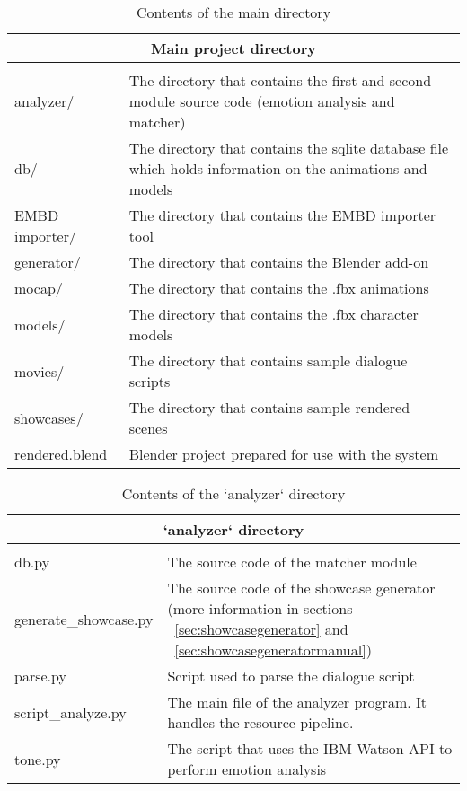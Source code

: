 \begin{table}[H]
	\centering
	\small
	
	\begin{tabular}{ |p{8.5em}|p{30.1em}| }
		\hline
		\multicolumn{2}{|c|}{\textbf{Main project directory}} \\
		\hline
		\thead{Item} & \thead{Description} \\
		\hline
		analyzer/ & The directory that contains the first and second module source code (emotion analysis and matcher) \\
		\hline
		db/ & The directory that contains the sqlite database file which holds information on the animations and models \\
		\hline
		EMBD importer/ & The directory that contains the EMBD importer tool \\
		\hline
		generator/ & The directory that contains the Blender add-on \\
		\hline
		mocap/ & The directory that contains the .fbx animations \\
		\hline
		models/ & The directory that contains the .fbx character models \\
		\hline
		movies/ & The directory that contains sample dialogue scripts \\
		\hline
		showcases/ & The directory that contains sample rendered scenes \\
		\hline
		rendered.blend & Blender project prepared for use with the system \\
		\hline
	\end{tabular}
	
	\caption{Contents of the main directory}
	\label{tab:maindirectory}
\end{table}

\begin{table}[H]
	\centering
	\small
	
	\begin{tabular}{ |p{8.5em}|p{30.1em}| }
		\hline
		\multicolumn{2}{|c|}{\textbf{`analyzer` directory}} \\
		\hline
		\thead{Item} & \thead{Description} \\
		\hline
		db.py & The source code of the matcher module \\
		\hline
		generate\_showcase.py & The source code of the showcase generator (more information in sections ~\ref{sec:showcasegenerator} and ~\ref{sec:showcasegeneratormanual}) \\
		\hline
		parse.py & Script used to parse the dialogue script \\
		\hline
		script\_analyze.py & The main file of the analyzer program. It handles the resource pipeline. \\
		\hline
		tone.py & The script that uses the IBM Watson API to perform emotion analysis \\
		\hline
	\end{tabular}
	
	\caption{Contents of the `analyzer` directory}
	\label{tab:analyzerdirectory}
\end{table}

